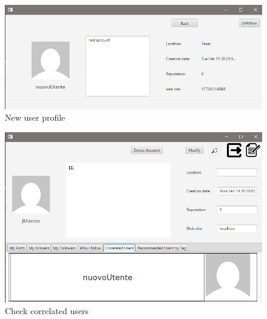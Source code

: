 \documentclass[11pt]{report}
\begin{document}
\begin{figure}[H]
  \centering
  \includegraphics[width=\textwidth,keepaspectratio=true]{img/user_manual/UtenteCorrelato3.png}
  \caption{New user profile}
  \label{fig:UtenteCorrelato3}
\end{figure}
\begin{figure}[H]
  \centering
  \includegraphics[width=\textwidth,keepaspectratio=true]{img/user_manual/UtenteCorrelato4.png}
  \caption{Check correlated users}
  \label{fig:UtenteCorrelato4}
\end{figure}
\end{document}
